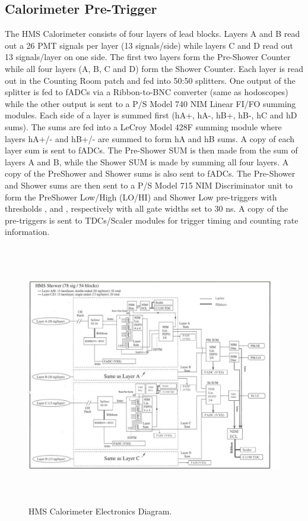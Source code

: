 \documentclass[11pt]{article}
\begin{document}
\subsection{Calorimeter Pre-Trigger}
The HMS Calorimeter consists of four layers of lead blocks. Layers A and B read out a 26 PMT signals per layer (13 signals/side) while layers C and D
read out 13 signals/layer on one side. The first two layers form the Pre-Shower Counter while all four layers (A, B, C and D) form the Shower Counter.  
Each layer is read out in the Counting Room patch and fed into 50:50 splitters. One output of the splitter is fed to fADCs via a Ribbon-to-BNC converter (same as hodoscopes)
while the other output is sent to a P/S Model 740 NIM Linear FI/FO summing modules. Each side of a layer is summed first (hA+, hA-, hB+, hB-, hC and hD sums). The sums are fed into
a LeCroy Model 428F summing module where layers hA+/- and hB+/- are summed to form hA and hB sums. A copy of each layer sum is sent to fADCs. The Pre-Shower SUM is then made from the sum of layers A and B, while the Shower SUM is made by summing all four layers. A copy of the PreShower and Shower sums is also sent to fADCs. The Pre-Shower and Shower sums are then sent to a P/S Model 715
NIM Discriminator unit to form the PreShower Low/High (LO/HI) and Shower Low pre-triggers with thresholds \hPrShLo, \hPrShHi and \hSHLo, respectively with all gate widths set to 30 ns. A copy of the pre-triggers is sent to TDCs/Scaler modules for trigger timing and counting rate
information.
\newpage
\begin{figure}[h!]
  \centering
  \includegraphics[width=6.5in, height=4.5in]{HMS_Cal_Trigger.pdf}
  \caption{HMS Calorimeter Electronics Diagram.}
  \label{fig:hms_cal_trg}
\end{figure}
\end{document}
